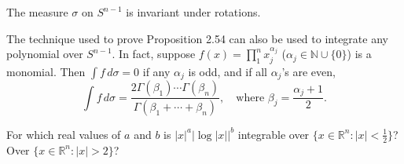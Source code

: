 	\begin{exercise}[Folland 2.62]
		The measure $\sigma$ on $S^{n-1}$ is invariant under rotations.
	\end{exercise}
	\begin{solution}

	\end{solution}

	\begin{exercise}[Folland 2.63]
		The technique used to prove Proposition 2.54 can also be used to integrate any polynomial over $S^{n-1}$. In fact, suppose $f(x) = \prod_1^n x_j^{\alpha_j}$ ($\alpha_j \in \mathbb{N} \cup \{0\}$) is a monomial. Then $\int f \, d\sigma = 0$ if any $\alpha_j$ is odd, and if all $\alpha_j$'s are even,
		\begin{equation}
			\int f \, d\sigma = \frac{2\Gamma(\beta_1)\cdots\Gamma(\beta_n)}{\Gamma(\beta_1 + \cdots + \beta_n)}, \quad\text{where } \beta_j = \frac{\alpha_j + 1}{2}.
		\end{equation}
	\end{exercise}
	\begin{solution}

	\end{solution}

	\begin{exercise}[Folland 2.64]
		For which real values of $a$ and $b$ is $|x|^a |\log |x||^b$ integrable over $\{x \in \mathbb{R}^n : |x| < \frac{1}{2}\}$? Over $\{x \in \mathbb{R}^n : |x| > 2\}$?
	\end{exercise}
	\begin{solution}

	\end{solution}


